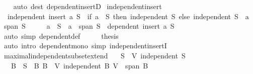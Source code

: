 \begin{isabellebody}
%
\isadelimproof
\ \ %
\endisadelimproof
%
\isatagproof
{}\isamarkupfalse%
\ {\isacharparenleft}{\kern0pt}auto\ dest{\isacharcolon}{\kern0pt}\ dependent{\isacharunderscore}{\kern0pt}insertD{\isacharparenright}{\kern0pt}%
\endisatagproof
{\isafoldproof}%
%
\isadelimproof
\isanewline
%
\endisadelimproof
\isanewline
{}\isamarkupfalse%
\ independent{\isacharunderscore}{\kern0pt}insert{\isacharcolon}{\kern0pt}\isanewline
\ \ {\isachardoublequoteopen}independent\ {\isacharparenleft}{\kern0pt}insert\ a\ S{\isacharparenright}{\kern0pt}\ {\isasymlongleftrightarrow}\ {\isacharparenleft}{\kern0pt}if\ a\ {\isasymin}\ S\ then\ independent\ S\ else\ independent\ S\ {\isasymand}\ a\ {\isasymnotin}\ span\ S{\isacharparenright}{\kern0pt}{\isachardoublequoteclose}\isanewline
%
\isadelimproof
%
\endisadelimproof
%
\isatagproof
{}\isamarkupfalse%
\ {\isacharminus}{\kern0pt}\isanewline
\ \ \isamarkupfalse%
\ {\isachardoublequoteopen}a\ {\isasymnotin}\ S\ {\isasymLongrightarrow}\ a\ {\isasymin}\ span\ S\ {\isasymLongrightarrow}\ dependent\ {\isacharparenleft}{\kern0pt}insert\ a\ S{\isacharparenright}{\kern0pt}{\isachardoublequoteclose}\isanewline
\ \ \ \ \isamarkupfalse%
\ {\isacharparenleft}{\kern0pt}auto\ simp{\isacharcolon}{\kern0pt}\ dependent{\isacharunderscore}{\kern0pt}def{\isacharparenright}{\kern0pt}\isanewline
\ \ \isamarkupfalse%
\ \isamarkupfalse%
\ {\isacharquery}{\kern0pt}thesis\isanewline
\ \ \ \ \isamarkupfalse%
\ {\isacharparenleft}{\kern0pt}auto\ intro{\isacharcolon}{\kern0pt}\ dependent{\isacharunderscore}{\kern0pt}mono\ simp{\isacharcolon}{\kern0pt}\ independent{\isacharunderscore}{\kern0pt}insertI{\isacharparenright}{\kern0pt}\isanewline
{}\isamarkupfalse%
%
\endisatagproof
{\isafoldproof}%
%
\isadelimproof
\isanewline
%
\endisadelimproof
\isanewline
{}\isamarkupfalse%
\ maximal{\isacharunderscore}{\kern0pt}independent{\isacharunderscore}{\kern0pt}subset{\isacharunderscore}{\kern0pt}extend{\isacharcolon}{\kern0pt}\isanewline
\ \ \ {\isachardoublequoteopen}S\ {\isasymsubseteq}\ V{\isachardoublequoteclose}\ {\isachardoublequoteopen}independent\ S{\isachardoublequoteclose}\isanewline
\ \ \ B\ \ {\isachardoublequoteopen}S\ {\isasymsubseteq}\ B{\isachardoublequoteclose}\ {\isachardoublequoteopen}B\ {\isasymsubseteq}\ V{\isachardoublequoteclose}\ {\isachardoublequoteopen}independent\ B{\isachardoublequoteclose}\ {\isachardoublequoteopen}V\ {\isasymsubseteq}\ span\ B{\isachardoublequoteclose}\isanewline

\end{isabellebody}

